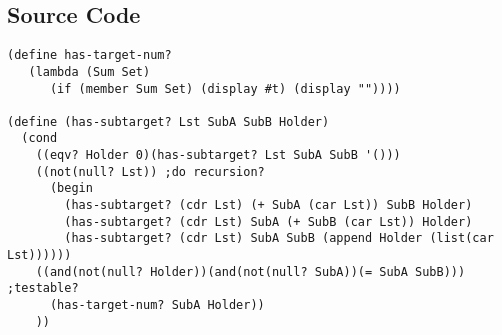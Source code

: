 \documentclass[a4paper,man,natbib]{apa6}
\begin{document}
\subsection{Source Code}
\begin{verbatim}
(define has-target-num?
   (lambda (Sum Set)
      (if (member Sum Set) (display #t) (display ""))))

(define (has-subtarget? Lst SubA SubB Holder)
  (cond
    ((eqv? Holder 0)(has-subtarget? Lst SubA SubB '()))
    ((not(null? Lst)) ;do recursion?
      (begin
        (has-subtarget? (cdr Lst) (+ SubA (car Lst)) SubB Holder)
        (has-subtarget? (cdr Lst) SubA (+ SubB (car Lst)) Holder)
        (has-subtarget? (cdr Lst) SubA SubB (append Holder (list(car Lst))))))
    ((and(not(null? Holder))(and(not(null? SubA))(= SubA SubB))) ;testable?
      (has-target-num? SubA Holder))
    ))
\end{verbatim}
\end{document}
